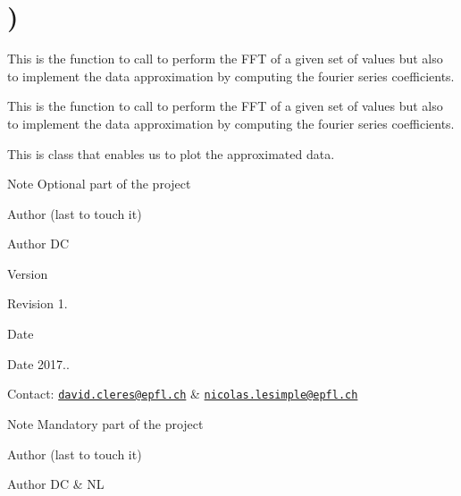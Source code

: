 \hypertarget{group__somewhere}{}\section{)}
\label{group__somewhere}


This is the function to call to perform the F\+FT of a given set of values but also to implement the data approximation by computing the fourier series coefficients.  


This is the function to call to perform the F\+FT of a given set of values but also to implement the data approximation by computing the fourier series coefficients. 

This is class that enables us to plot the approximated data.

\begin{DoxyNote}{Note}
Optional part of the project
\end{DoxyNote}
\begin{DoxyAuthor}{Author}
(last to touch it) 
\end{DoxyAuthor}
\begin{DoxyParagraph}{Author}
DC 
\end{DoxyParagraph}


\begin{DoxyVersion}{Version}

\end{DoxyVersion}
\begin{DoxyParagraph}{Revision}
1. 
\end{DoxyParagraph}


\begin{DoxyDate}{Date}

\end{DoxyDate}
\begin{DoxyParagraph}{Date}
2017.. 
\end{DoxyParagraph}


Contact\+: \href{mailto:david.cleres@epfl.ch}{\tt david.\+cleres@epfl.\+ch} \& \href{mailto:nicolas.lesimple@epfl.ch}{\tt nicolas.\+lesimple@epfl.\+ch}

\begin{DoxyNote}{Note}
Mandatory part of the project
\end{DoxyNote}
\begin{DoxyAuthor}{Author}
(last to touch it) 
\end{DoxyAuthor}
\begin{DoxyParagraph}{Author}
DC \& NL
\end{DoxyParagraph}


